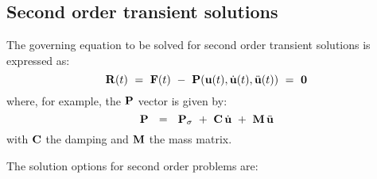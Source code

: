 \subsection{Second order transient solutions}
\label{trans2}

The governing equation to be solved for second order transient solutions
is expressed as:
\begin{equation}
\mathbf{R} (t) ~=~
\mathbf{F}(t) ~-~ \mathbf{P}( \mathbf{u}(t) , \dot{\mathbf{u}} (t) , \ddot{\mathbf{u}}(t) )
~=~ {\bf 0}
\end{equation}
where, for example, the $\mathbf{P}$ vector is given by:
\begin{equation}
\mathbf{P}~~=~~ \mathbf{P}_{\sigma} ~+~ \mathbf{C} \, \dot{\mathbf{u}} ~+~ \mathbf{M} \, \ddot{\mathbf{u}}
\end{equation}
with $\mathbf{C}$ the damping and $\mathbf{M}$ the mass matrix.

The solution options for second order problems are:

